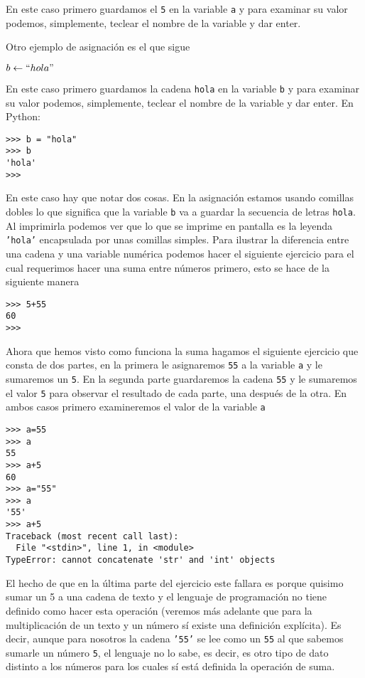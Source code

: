 \documentclass{report}
\begin{document}
En este caso primero guardamos el {\tt{5}} en la variable {\tt{a}} y para
examinar su valor podemos, simplemente, teclear el nombre de la variable y dar
enter.

Otro ejemplo de asignación es el que sigue

\begin{algorithmic}
\State $b \gets ``hola"$
\end{algorithmic}

En este caso primero guardamos la cadena {\tt{hola}} en la variable {\tt{b}} y 
para examinar su valor podemos, simplemente, teclear el nombre de la variable 
y dar enter. En Python:

\begin{verbatim}
>>> b = "hola"
>>> b
'hola'
>>> 
\end{verbatim}

En este caso hay que notar dos cosas. En la asignación estamos usando comillas 
dobles lo que significa que la variable {\tt{b}} va a guardar la secuencia de
letras {\tt{hola}}. Al imprimirla podemos ver que lo que se imprime en pantalla
es la leyenda {\tt{'hola'}} encapsulada por unas comillas simples. Para 
ilustrar la diferencia entre una cadena y una variable numérica podemos hacer
el siguiente ejercicio para el cual requerimos hacer una suma entre números 
primero, esto se hace de la siguiente manera

\begin{verbatim}
>>> 5+55
60
>>> 
\end{verbatim}

Ahora que hemos visto como funciona la suma hagamos el siguiente ejercicio que 
consta de dos partes, en la primera le asignaremos {\tt{55}} a la variable 
{\tt{a}} y le sumaremos un {\tt{5}}. En la segunda parte guardaremos la cadena
{\tt{55}} y le sumaremos el valor {\tt{5}} para observar el resultado de cada
parte, una después de la otra. En ambos casos primero examineremos el valor
de la variable {\tt{a}}

\begin{verbatim}
>>> a=55
>>> a
55
>>> a+5
60
>>> a="55"
>>> a
'55'
>>> a+5
Traceback (most recent call last):
  File "<stdin>", line 1, in <module>
TypeError: cannot concatenate 'str' and 'int' objects
\end{verbatim}

El hecho de que en la última parte del ejercicio este fallara es porque
quisimo sumar un 5 a una cadena de texto y el lenguaje de programación no 
tiene definido como hacer esta operación (veremos más adelante que para la
multiplicación de un texto y un número sí existe una definición explícita).
Es decir, aunque para nosotros la cadena {\tt{'55'}} se lee como un {\tt{55}}
al que sabemos sumarle un número {\tt{5}}, el lenguaje no lo sabe, es decir,
es otro tipo de dato distinto a los números para los cuales sí está definida
la operación de suma.
\end{document}
